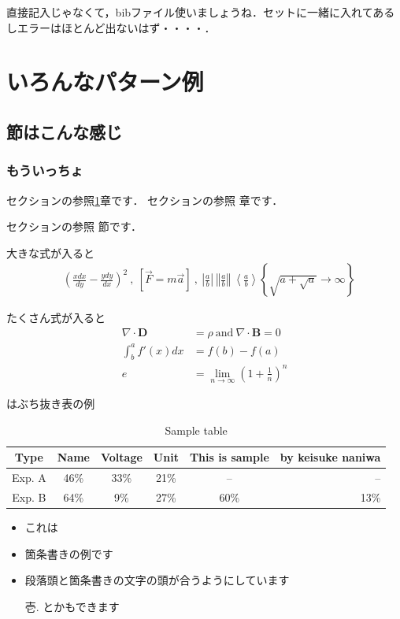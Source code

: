 \documentclass[a4j]{jsarticle}
\numberwithin{equation}{section}%
\begin{document}
直接記入じゃなくて，bibファイル使いましょうね．セットに一緒に入れてあるしエラーはほとんど出ないはず・・・・．

\section{いろんなパターン例}\label{sec:基本}
\subsection{節はこんな感じ}\label{sec:基本2}
\subsubsection{もういっちょ}

セクションの参照\ref{sec:基本}章です．
セクションの参照 章です．

セクションの参照 節です．

大きな式が入ると
\begin{align}
 & \left(\frac{xdx}{dy} -\frac{ydy}{dx}\right)^{2} \ ,\ \left[\vec{F} =m\vec{a}\right] \ ,\ \left| \frac{a}{b}\right| \ \left\Vert \frac{a}{b}\right\Vert \ \left< \frac{a}{b}\right> \left\{\sqrt{a+\sqrt{a}}\rightarrow \infty \right\} 
\end{align}

たくさん式が入ると
\begin{align}
 \nabla \cdot \mathbf{D} & =\rho \ \mathrm{and} \ \nabla \cdot \mathbf{B} =0\ \\
 \int ^{a}_{b} f'( x) dx & = f( b) -f( a)\\
 e &= \lim\limits _{n\rightarrow \infty }\left( 1+\frac{1}{n}\right)^{n}
\end{align}

はぶち抜き表の例

\begin{table}[tb]
  \caption{Sample table}
   \label{tab:test}
   \centering
   \begin{tabular}{cccccr}\hline
    Type & Name & Voltage & Unit & This is sample & by keisuke naniwa\\ \hline \hline
   Exp. A & 46\%& 33\%& 21\%& --& --\\ 
   Exp. B & 64\%& 9\%& 27\%& 60\%& 13\%\\ \hline    
   \end{tabular}
\end{table}

\begin{itemize}
 \item これは
 \item 箇条書きの例です
 \item 段落頭と箇条書きの文字の頭が合うようにしています
 \item[壱.] とかもできます 
\end{itemize}
\end{document}
